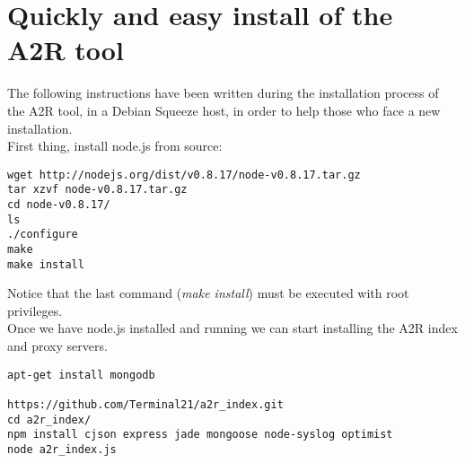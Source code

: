 \documentclass{article}
\begin{document}
\newcommand\PYan[1]{\textcolor[rgb]{0.40,0.40,0.40}{#1}}
\newcommand\PYao[1]{\textcolor[rgb]{0.73,0.40,0.13}{\textbf{#1}}}
\newcommand\PYal[1]{\textcolor[rgb]{0.25,0.50,0.50}{\textit{#1}}}
\newcommand\PYam[1]{\textbf{#1}}
\newcommand\PYab[1]{\textit{#1}}
\newcommand\PYac[1]{\textcolor[rgb]{0.73,0.13,0.13}{#1}}
\newcommand\PYaa[1]{\textcolor[rgb]{0.50,0.50,0.50}{#1}}
\newcommand\PYaf[1]{\textcolor[rgb]{0.25,0.50,0.50}{\textit{#1}}}
\newcommand\PYag[1]{\textcolor[rgb]{0.40,0.40,0.40}{#1}}
\newcommand\PYad[1]{\textcolor[rgb]{0.00,0.25,0.82}{#1}}
\newcommand\PYae[1]{\textcolor[rgb]{0.40,0.40,0.40}{#1}}
\newcommand\PYaz[1]{\textcolor[rgb]{0.00,0.63,0.00}{#1}}
\newcommand\PYax[1]{\textcolor[rgb]{0.60,0.60,0.60}{\textbf{#1}}}
\newcommand\PYay[1]{\textcolor[rgb]{0.00,0.50,0.00}{\textbf{#1}}}
\newcommand\PYar[1]{\textcolor[rgb]{0.10,0.09,0.49}{#1}}
\newcommand\PYas[1]{\textcolor[rgb]{0.73,0.13,0.13}{\textit{#1}}}
\newcommand\PYap[1]{\textcolor[rgb]{0.00,0.50,0.00}{\textbf{#1}}}
\newcommand\PYaq[1]{\textcolor[rgb]{0.53,0.00,0.00}{#1}}
\newcommand\PYav[1]{\textcolor[rgb]{0.67,0.13,1.00}{\textbf{#1}}}
\newcommand\PYaw[1]{\textcolor[rgb]{0.40,0.40,0.40}{#1}}
\newcommand\PYat[1]{\textcolor[rgb]{0.10,0.09,0.49}{#1}}
\newcommand\PYau[1]{\textcolor[rgb]{0.10,0.09,0.49}{#1}}

\section{Quickly and easy install of the A2R tool}
The following instructions have been written during the installation process of the A2R tool, in a Debian Squeeze host, in order to help those who face a new installation.\\

First thing, install node.js from source:

\begin{verbatim}
wget http://nodejs.org/dist/v0.8.17/node-v0.8.17.tar.gz
tar xzvf node-v0.8.17.tar.gz
cd node-v0.8.17/
ls
./configure
make
make install
\end{verbatim}

Notice that the last command (\emph{make install}) must be executed with root privileges. \\

Once we have node.js installed and running we can start installing the A2R index and proxy servers.

\begin{Verbatim}[commandchars=\\\{\}]
apt-get install mongodb

https://github.com/Terminal21/a2r_index.git
cd a2r_index/
npm install cjson express jade mongoose node-syslog optimist
node a2r_index.js
\end{Verbatim}
\end{document}
